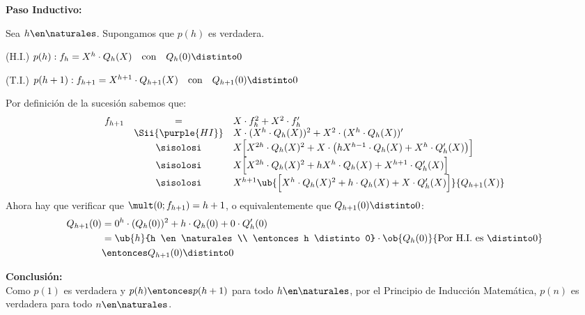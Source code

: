 \begin{enumerate}[label=\roman*)]
\begin{enumerate}[label=\violet{(\arabic*)}]
                \textbf{Paso Inductivo:}

                Sea $h \en \naturales$. Supongamos que $p(h)$ es verdadera.

                (H.I.) $p(h): f_h = X^h \cdot Q_h(X) \quad \text{con} \quad Q_h(0) \distinto 0$

                (T.I.) $p(h+1): f_{h+1} = X^{h+1} \cdot Q_{h+1}(X) \quad \text{con} \quad Q_{h+1}(0) \distinto 0$

                Por definición de la sucesión sabemos que:
                $$
                  \begin{array}{rcl}
                    f_{h+1} & =                 & X \cdot f_h^2 + X^2 \cdot f'_h                                                                       \\
                            & \Sii{\purple{HI}} & X \cdot (X^h \cdot Q_h(X))^2 + X^2 \cdot (X^h \cdot Q_h(X))'                                         \\
                            & \sisolosi         & X \Big[ X^{2h} \cdot Q_h(X)^2 + X \cdot \big( h X^{h-1} \cdot Q_h(X) + X^h \cdot Q'_h(X) \big) \Big] \\
                            & \sisolosi         & X \Big[ X^{2h} \cdot Q_h(X)^2 + h X^h \cdot Q_h(X) + X^{h+1} \cdot Q'_h(X) \Big]                     \\
                            & \sisolosi         & X^{h+1}
                    \ub{
                      \Big[ X^h \cdot Q_h(X)^2 + h \cdot Q_h(X) + X \cdot Q'_h(X) \Big]
                    }{
                      Q_{h+1}(X)
                    }
                  \end{array}
                $$
                Ahora hay que verificar que $\mult(0; f_{h+1}) = h+1$, o equivalentemente que $Q_{h+1}(0) \distinto 0$:
                \begin{align*}
                  Q_{h+1}(0) & = 0^h \cdot (Q_h(0))^2 + h \cdot Q_h(0) + 0 \cdot Q'_h(0) \\
                             & = \ub{h}{h \en \naturales                                 \\ \entonces h \distinto 0}
                  \cdot
                  \ob{Q_h(0)}{\text{Por H.I. es } \distinto 0}                           \\
                             & \entonces Q_{h+1}(0) \distinto 0
                \end{align*}

                \vspace{0.5cm}
                \noindent\textbf{Conclusión:} \\
                Como $p(1)$ es verdadera y $p(h) \entonces p(h+1)$ para todo $h \en \naturales$, por el Principio de Inducción Matemática, $p(n)$ es verdadera para todo $n \en \naturales$.

        \end{enumerate}

\end{enumerate}

\begin{aportes}
  \item {}
  \item {}
\end{aportes}
